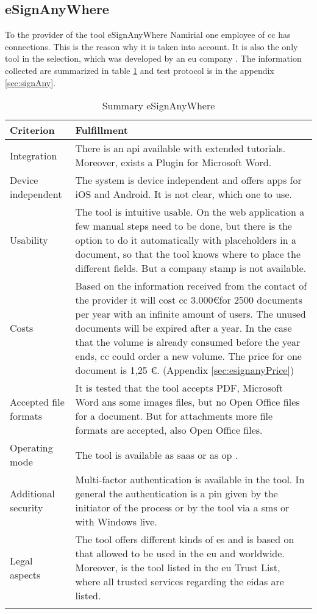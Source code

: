 \subsection{eSignAnyWhere}
To the provider of the tool eSignAnyWhere Namirial one employee of \gls{cc} has connections. This is the reason why it is taken into account. It is also the only tool in the selection, which was developed by an \gls{eu} company \parencite{signAny2018contact}. The information collected are summarized in table \ref{tab:esignany} and test protocol is in the appendix \ref{sec:signAny}. \newpage
	\begin{longtable}{|p{4cm}|p{10cm}|} \hline
		\rowcolor{Gray}Criterion & Fulfillment \\ \hline
		Integration & There is an \gls{api} available with extended tutorials. Moreover, exists a Plugin for Microsoft Word. \parencite{signAny2018api, signAny2018dev,signAny2018guide} \\ \hline
		Device independent & The system is device independent and offers \glspl{app} for iOS and Android. It is not clear, which one to use. \parencite{signAny2018info} \\ \hline
		Usability & The tool is intuitive usable. On the web application a few manual steps need to be done, but there is the option to do it automatically with placeholders in a document, so that the tool knows where to place the different fields. But a company stamp is not available. \parencite{signAny2018guide} \\ \hline
		Costs & Based on the information received from the contact of the provider it will cost \gls{cc} 3.000\euro for 2500 documents per year with an infinite amount of users. The unused documents will be expired after a year. In the case that the volume is already consumed before the year ends, \gls{cc} could order a new volume. The price for one document is 1,25 \euro. (Appendix \ref{sec:esignanyPrice}) \\ \hline
		Accepted file formats & It is tested that the tool accepts \gls{PDF}, Microsoft Word ans some images files, but no Open Office files for a document. But for attachments more file formats are accepted, also Open Office files. \\ \hline
		Operating mode &  The tool is available as \gls{saas} or as \gls{op} \parencite{signAny2018business}. \\ \hline
		Additional security & Multi-factor authentication is available in the tool. In general the authentication is a pin given by the initiator of the process or by the tool via a \gls{sms} or with Windows live. \parencite{signAny2018sign} \\ \hline
		Legal aspects & The tool offers different kinds of \gls{es} and is based on that allowed to be used in the \gls{eu} and worldwide. Moreover, is the tool listed in the \gls{eu} Trust List, where all trusted services regarding the \gls{eidas} are listed. \parencite{signAny2018sign,signAny2018trust} \\ \hline
	\caption{Summary eSignAnyWhere}
	\label{tab:esignany}
	\end{longtable}
